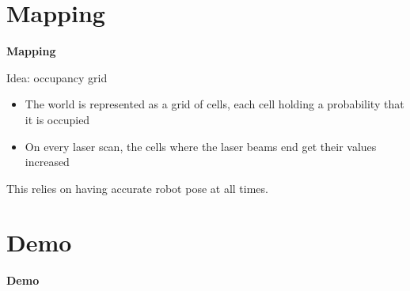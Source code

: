 \documentclass[xcolor=dvipsnames]{beamer}
\begin{document}
  {
    \begin{frame}{}
    \end{frame}
  }
  
  \section{Mapping}
  \begin{frame}{\bf Mapping}

    Idea: occupancy grid
    \vspace{1cm}

    \begin{itemize}
    \item The world is represented as a grid of cells, each cell holding a
          probability that it is occupied
    \item On every laser scan, the cells where the laser beams end get their
          values increased
    \end{itemize}
    \vspace{1cm}

    This relies on having accurate robot pose at all times.
  \end{frame}
  
  \section{Demo}
  \begin{frame}{\bf Demo}
    
  \end{frame}
  
\end{document}
